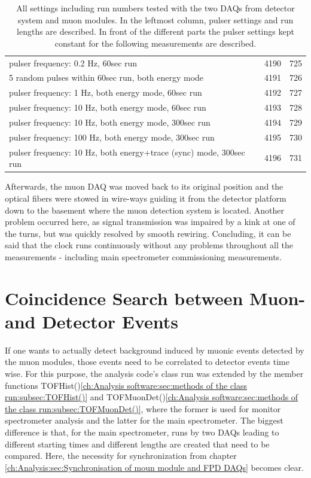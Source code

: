 \begin{table}
\begin{tabularx}{0.9 \textwidth}{|X|cc|}
		\hline
		pulser frequency: 0.2 Hz, 60sec run & 4190 & 725 \\
		5 random pulses within 60sec run, both energy mode & 4191 & 726 \\
		pulser frequency: 1 Hz, both energy mode, 60sec run & 4192 & 727 \\
		pulser frequency: 10 Hz, both energy mode, 60sec run & 4193 & 728 \\
		pulser frequency: 10 Hz, both energy mode, 300sec run & 4194 & 729 \\
		pulser frequency: 100 Hz, both energy mode, 300sec run & 4195 & 730 \\
		pulser frequency: 10 Hz, both energy+trace (sync) mode, 300sec run & 4196 & 731 \\
  		\hline
  	\end{tabularx}
	\caption[Synchronization test Settings]{All settings including run numbers tested with the two DAQs from detector system and muon modules. In the leftmost column, pulser settings and run lengths are described. In front of the different parts the pulser settings kept constant for the following measurements are described.}
	\label{tab:syncTests}
  \end{table}

  Afterwards, the muon DAQ was moved back to its original position and the optical fibers were stowed in wire-ways guiding it from the detector platform down to the basement where the muon detection system is located. Another problem occurred here, as signal transmission was impaired by a kink at one of the turns, but was quickly resolved by smooth rewiring.
  Concluding, it can be said that the clock runs continuously without any problems throughout all the measurements - including main spectrometer commissioning measurements.

  
  \section{Coincidence Search between Muon- and Detector Events}
  \label{ch:Analysis:sec:Monitor Spectrometer Measurements}
  If one wants to actually detect background induced by muonic events detected by the muon modules, those events need to be correlated to detector events time wise. For this purpose, the analysis code's class run was extended by the member functions TOFHist()\ref{ch:Analysis software:sec:methods of the class run:subsec:TOFHist()} and TOFMuonDet()\ref{ch:Analysis software:sec:methods of the class run:subsec:TOFMuonDet()}, where the former is used for monitor spectrometer analysis and the latter for the main spectrometer. The biggest difference is that, for the main spectrometer, runs by two DAQs leading to different starting times and different lengths are created that need to be compared. Here, the necessity for synchronization from chapter \ref{ch:Analysis:sec:Synchronisation of moun module and FPD DAQs} becomes clear.
  
